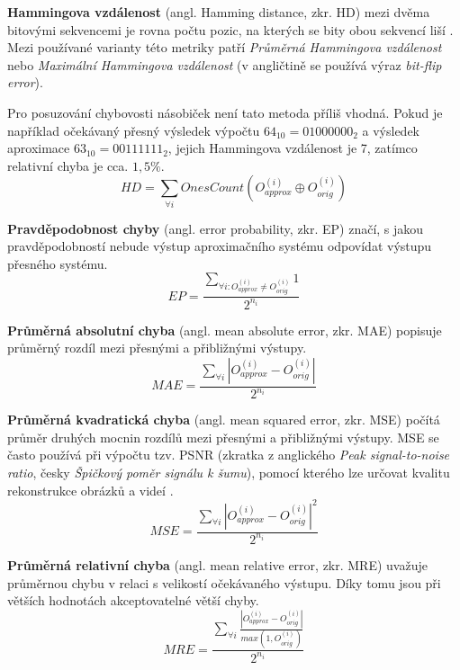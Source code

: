 \bigskip

\textbf{Hammingova vzdálenost} (angl. Hamming distance, zkr. HD) mezi dvěma bitovými sekvencemi je rovna počtu pozic, na kterých se bity obou sekvencí liší \cite{hamming_dist}. Mezi používané varianty této metriky patří \textit{Průměrná Hammingova vzdálenost} nebo \textit{Maximální Hammingova vzdálenost} (v angličtině se používá výraz \textit{bit-flip error}).

Pro posuzování chybovosti násobiček není tato metoda příliš vhodná. Pokud je například očekávaný přesný výsledek výpočtu $64_{10} = 0100 0000_{2}$ a výsledek aproximace $63_{10} = 0011 1111_{2}$, jejich Hammingova vzdálenost je 7, zatímco relativní chyba je cca. $1,5 \%$.
\begin{equation}
    HD = \sum_{\forall i} OnesCount(O_{approx}^{(i)} \oplus O_{orig}^{(i)})
\end{equation}

\textbf{Pravděpodobnost chyby} (angl. error probability, zkr. EP) značí, s jakou pravděpodobností nebude výstup aproximačního systému odpovídat výstupu přesného systému.
\begin{equation}
    EP = \frac{\sum_{\forall {i:O_{approx}^{(i)} \neq O_{orig}^{(i)}}} 1} {2^{n_i}}
\end{equation}

\textbf{Průměrná absolutní chyba} (angl. mean absolute error, zkr. MAE) popisuje průměrný rozdíl mezi přesnými a přibližnými výstupy.
\begin{equation}
    MAE = \frac{\sum_{\forall i} {\left|{{O_{approx}^{(i)} - O_{orig}^{(i)}}}\right|}} {2^{n_i}}
\end{equation}

\textbf{Průměrná kvadratická chyba} (angl. mean squared error, zkr. MSE) počítá průměr druhých mocnin rozdílů mezi přesnými a přibližnými výstupy. MSE se často používá při výpočtu tzv. PSNR (zkratka z anglického \textit{Peak signal-to-noise ratio}, česky \textit{Špičkový poměr signálu k šumu}), pomocí kterého lze určovat kvalitu rekonstrukce obrázků a videí \cite{error_metrics}.
\begin{equation}
    MSE = \frac{\sum_{\forall i} {\left|{{O_{approx}^{(i)} - O_{orig}^{(i)}}}\right|^2}} {2^{n_i}}
\end{equation}

\textbf{Průměrná relativní chyba} (angl. mean relative error, zkr. MRE) uvažuje průměrnou chybu v relaci s velikostí očekávaného výstupu. Díky tomu jsou při větších hodnotách akceptovatelné větší chyby.
\begin{equation}
    MRE = \frac{\sum_{\forall i} \frac{\left|{{O_{approx}^{(i)} - O_{orig}^{(i)}}}\right|} {max(1,O_{orig}^{(i)})}} {2^{n_i}}
\end{equation}

